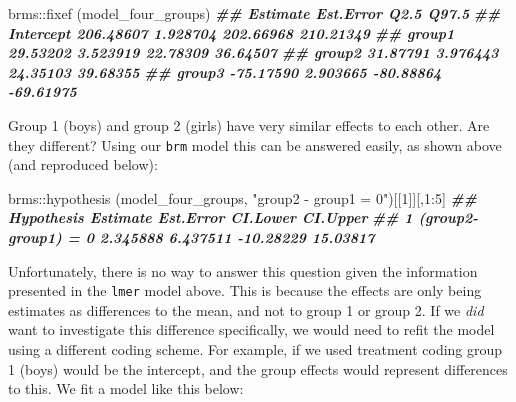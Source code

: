 \documentclass[
]{book}
\newenvironment{Shaded}{\begin{snugshade}}{\end{snugshade}}
\newcommand{\DecValTok}[1]{\textcolor[rgb]{0.00,0.00,0.81}{#1}}
\newcommand{\DocumentationTok}[1]{\textcolor[rgb]{0.56,0.35,0.01}{\textbf{\textit{#1}}}}
\newcommand{\FunctionTok}[1]{\textcolor[rgb]{0.00,0.00,0.00}{#1}}
\newcommand{\NormalTok}[1]{#1}
\newcommand{\SpecialCharTok}[1]{\textcolor[rgb]{0.00,0.00,0.00}{#1}}
\newcommand{\StringTok}[1]{\textcolor[rgb]{0.31,0.60,0.02}{#1}}
\begin{document}
\begin{Shaded}
\begin{Highlighting}[]
\NormalTok{brms}\SpecialCharTok{::}\FunctionTok{fixef}\NormalTok{ (model\_four\_groups)}
\DocumentationTok{\#\#            Estimate Est.Error      Q2.5     Q97.5}
\DocumentationTok{\#\# Intercept 206.48607  1.928704 202.66968 210.21349}
\DocumentationTok{\#\# group1     29.53202  3.523919  22.78309  36.64507}
\DocumentationTok{\#\# group2     31.87791  3.976443  24.35103  39.68355}
\DocumentationTok{\#\# group3    {-}75.17590  2.903665 {-}80.88864 {-}69.61975}
\end{Highlighting}
\end{Shaded}

Group 1 (boys) and group 2 (girls) have very similar effects to each other. Are they different? Using our \texttt{brm} model this can be answered easily, as shown above (and reproduced below):

\begin{Shaded}
\begin{Highlighting}[]
\NormalTok{brms}\SpecialCharTok{::}\FunctionTok{hypothesis}\NormalTok{ (model\_four\_groups, }\StringTok{"group2 {-} group1 = 0"}\NormalTok{)[[}\DecValTok{1}\NormalTok{]][,}\DecValTok{1}\SpecialCharTok{:}\DecValTok{5}\NormalTok{]}
\DocumentationTok{\#\#            Hypothesis Estimate Est.Error  CI.Lower CI.Upper}
\DocumentationTok{\#\# 1 (group2{-}group1) = 0 2.345888  6.437511 {-}10.28229 15.03817}
\end{Highlighting}
\end{Shaded}

Unfortunately, there is no way to answer this question given the information presented in the \texttt{lmer} model above. This is because the effects are only being estimates as differences to the mean, and not to group 1 or group 2. If we \emph{did} want to investigate this difference specifically, we would need to refit the model using a different coding scheme. For example, if we used treatment coding group 1 (boys) would be the intercept, and the group effects would represent differences to this. We fit a model like this below:
\end{document}
